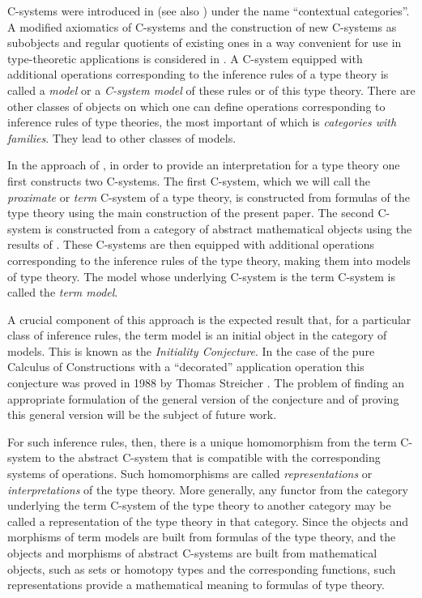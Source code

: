 \documentclass[12pt]{amsart}
\numberwithin{proposition}{subsection}
\begin{document}
C-systems were introduced in \cite{Cartmell0} (see also \cite{Cartmell1}) under
the name ``contextual categories''. A modified axiomatics of C-systems and the
construction of new C-systems as subobjects and regular quotients of 
existing ones in a way convenient for use in type-theoretic applications is
considered in \cite{Csubsystems}. A C-system equipped with additional
operations corresponding to the inference rules of a type theory is called a
{\em model} or a {\em C-system model} of these rules or of this type theory. There are
other classes of objects on which one can define operations corresponding to
inference rules of type theories, the most important of which is {\em categories with families}.
They lead to other classes of models.

In the approach of \cite{CMUtalk}, in order to provide an interpretation for a
type theory one first constructs two C-systems.  The first C-system, which we will
call the {\em proximate} or {\em term} C-system of a type theory, is constructed from
formulas of the type theory using the main construction of the present paper.
The second C-system is constructed from a category of abstract mathematical
objects using the results of \cite{Cfromauniverse}. These C-systems are then
equipped with additional operations corresponding to the inference rules of the
type theory, making them into models of type theory.  The model whose underlying
C-system is the term C-system is called the {\em term model}.

A crucial component of this approach is the expected result that, for a
particular class of inference rules, the term model is an initial object in the
category of models. This is known as the {\em Initiality Conjecture}. In the case of
the pure Calculus of Constructions with a ``decorated'' application operation
this conjecture was proved in 1988 by Thomas Streicher \cite{Streicher}. The
problem of finding an appropriate formulation of the general version of the
conjecture and of proving this general version will be the subject of future
work.

For such inference rules, then, there is a unique homomorphism from the term
C-system to the abstract C-system that is compatible with the corresponding
systems of operations. Such homomorphisms are called {\em representations} or
{\em interpretations} of the type theory. More generally, any functor from the
category underlying the term C-system of the type theory to another category
may be called a representation of the type theory in that category. Since
the objects and morphisms of term models are built from formulas of the type theory,
and the objects and morphisms of abstract C-systems are built from mathematical
objects, such as sets or homotopy types and the corresponding functions, such
representations provide a mathematical meaning to formulas of type theory.
\end{document}
